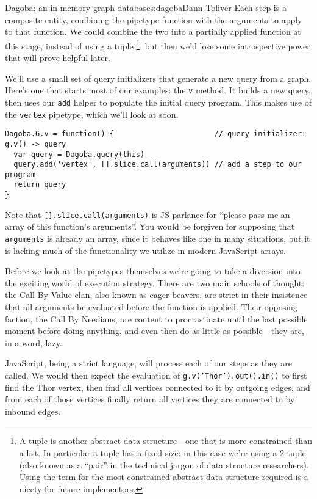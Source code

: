 \begin{aosachapter}{Dagoba: an in-memory graph database}{s:dagoba}{Dann Toliver}
Each step is a composite entity, combining the pipetype function with
the arguments to apply to that function. We could combine the two into a
partially applied function at this stage, instead of using a tuple
\footnote{A tuple is another abstract data structure---one that is more
  constrained than a list. In particular a tuple has a fixed size: in
  this case we're using a 2-tuple (also known as a ``pair'' in the
  technical jargon of data structure researchers). Using the term for
  the most constrained abstract data structure required is a nicety for
  future implementors.}, but then we'd lose some introspective power
that will prove helpful later.

We'll use a small set of query initializers that generate a new query
from a graph. Here's one that starts most of our examples: the
\texttt{v} method. It builds a new query, then uses our \texttt{add}
helper to populate the initial query program. This makes use of the
\texttt{vertex} pipetype, which we'll look at soon.

\begin{verbatim}
Dagoba.G.v = function() {                       // query initializer: g.v() -> query
  var query = Dagoba.query(this)
  query.add('vertex', [].slice.call(arguments)) // add a step to our program
  return query
}
\end{verbatim}

Note that \texttt{{[}{]}.slice.call(arguments)} is JS parlance for
``please pass me an array of this function's arguments''. You would be
forgiven for supposing that \texttt{arguments} is already an array,
since it behaves like one in many situations, but it is lacking much of
the functionality we utilize in modern JavaScript arrays.

\label{the-problem-with-being-eager}

Before we look at the pipetypes themselves we're going to take a
diversion into the exciting world of execution strategy. There are two
main schools of thought: the Call By Value clan, also known as eager
beavers, are strict in their insistence that all arguments be evaluated
before the function is applied. Their opposing faction, the Call By
Needians, are content to procrastinate until the last possible moment
before doing anything, and even then do as little as possible---they
are, in a word, lazy.

JavaScript, being a strict language, will process each of our steps as
they are called. We would then expect the evaluation of
\texttt{g.v('Thor').out().in()} to first find the Thor vertex, then find
all vertices connected to it by outgoing edges, and from each of those
vertices finally return all vertices they are connected to by inbound
edges.


\end{aosachapter}
